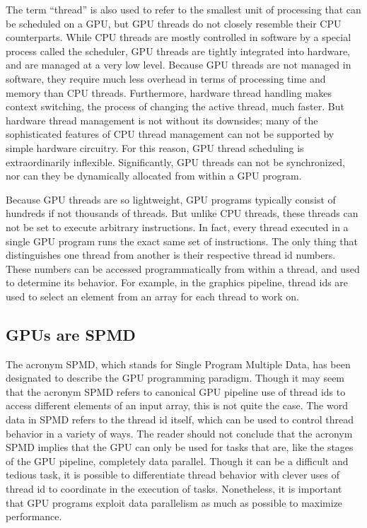 \documentclass[12pt,twoside]{reedthesis}
\begin{document}
The term ``thread'' is also used to refer to the smallest unit of processing that can be scheduled on a GPU, but GPU threads do not closely resemble their CPU counterparts. While CPU threads are mostly controlled in software by a special process called the scheduler, GPU threads are tightly integrated into hardware, and are managed at a very low level. Because GPU threads are not managed in software, they require much less overhead in terms of processing time and memory than CPU threads. Furthermore, hardware thread handling makes context switching, the process of changing the active thread, much faster. But hardware thread management is not without its downsides; many of the sophisticated features of CPU thread management can not be supported by simple hardware circuitry. For this reason, GPU thread scheduling is extraordinarily inflexible. Significantly, GPU threads can not be synchronized, nor can they be dynamically allocated from within a GPU program.

Because GPU threads are so lightweight, GPU programs typically consist of hundreds if not thousands of threads. But unlike CPU threads, these threads can not be set to execute arbitrary instructions. In fact, every thread executed in a single GPU program runs the exact same set of instructions. The only thing that distinguishes one thread from another is their respective thread id numbers. These numbers can be accessed programmatically from within a thread, and used to determine its behavior. For example, in the graphics pipeline, thread ids are used to select an element from an array for each thread to work on.

\subsection{GPUs are SPMD}

The acronym SPMD, which stands for Single Program Multiple Data, has been designated to describe the GPU programming paradigm. Though it may seem that the acronym SPMD refers to canonical GPU pipeline use of thread ids to access different elements of an input array, this is not quite the case. The word data in SPMD refers to the thread id itself, which can be used to control thread behavior in a variety of ways. The reader should not conclude that the acronym SPMD implies that the GPU can only be used for tasks that are, like the stages of the GPU pipeline, completely data parallel. Though it can be a difficult and tedious task, it is possible to differentiate thread behavior with clever uses of thread id to coordinate in the execution of tasks. Nonetheless, it is important that GPU programs exploit data parallelism as much as possible to maximize performance.
\end{document}
